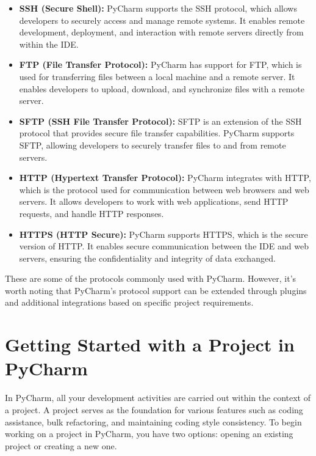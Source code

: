 \begin{itemize}
	\item \textbf{SSH (Secure Shell):} PyCharm supports the SSH protocol, which allows developers to securely access and manage remote systems. It enables remote development, deployment, and interaction with remote servers directly from within the IDE.
	
	\item \textbf{FTP (File Transfer Protocol):} PyCharm has support for FTP, which is used for transferring files between a local machine and a remote server. It enables developers to upload, download, and synchronize files with a remote server.
	
	\item \textbf{SFTP (SSH File Transfer Protocol):} SFTP is an extension of the SSH protocol that provides secure file transfer capabilities. PyCharm supports SFTP, allowing developers to securely transfer files to and from remote servers.
	
	\item \textbf{HTTP (Hypertext Transfer Protocol):} PyCharm integrates with HTTP, which is the protocol used for communication between web browsers and web servers. It allows developers to work with web applications, send HTTP requests, and handle HTTP responses.
	
	\item \textbf{HTTPS (HTTP Secure):} PyCharm supports HTTPS, which is the secure version of HTTP. It enables secure communication between the IDE and web servers, ensuring the confidentiality and integrity of data exchanged.
\end{itemize}

These are some of the protocols commonly used with PyCharm. However, it's worth noting that PyCharm's protocol support can be extended through plugins and additional integrations based on specific project requirements.

\section{Getting Started with a Project in PyCharm}

In PyCharm, all your development activities are carried out within the context of a project. A project serves as the foundation for various features such as coding assistance, bulk refactoring, and maintaining coding style consistency. To begin working on a project in PyCharm, you have two options: opening an existing project or creating a new one.

